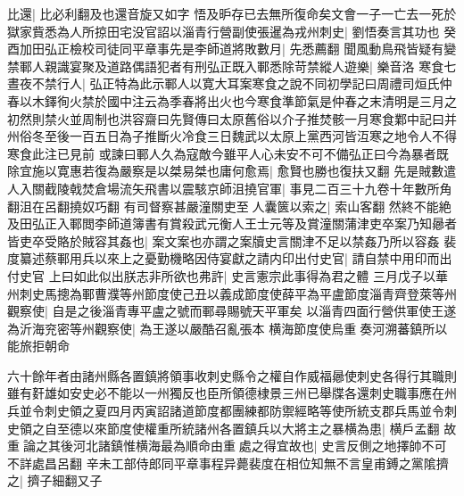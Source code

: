 比還|{
	比必利翻及也還音旋又如字}
悟及昈存已去無所復命矣文會一子一亡去一死於獄家貲悉為人所掠田宅没官詔以淄青行營副使張暹為戎州刺史|{
	劉悟奏言其功也}
癸酉加田弘正檢校司徒同平章事先是李師道將敗數月|{
	先悉薦翻}
聞風動鳥飛皆疑有變禁鄆人親識宴聚及道路偶語犯者有刑弘正既入鄆悉除苛禁縱人遊樂|{
	樂音洛}
寒食七晝夜不禁行人|{
	弘正特為此示鄆人以寛大耳案寒食之說不同初學記曰周禮司烜氏仲春以木鐸徇火禁於國中注云為季春將出火也今寒食準節氣是仲春之末清明是三月之初然則禁火並周制也洪容齋曰先賢傳曰太原舊俗以介子推焚骸一月寒食鄴中記曰并州俗冬至後一百五日為子推斷火冷食三日魏武以太原上黨西河皆沍寒之地令人不得寒食此注已見前}
或諫曰鄆人久為寇敵今雖平人心未安不可不備弘正曰今為暴者既除宜施以寛惠若復為嚴察是以桀易桀也庸何愈焉|{
	愈賢也勝也復扶又翻}
先是賊數遣人入關截陵戟焚倉場流矢飛書以震駭京師沮撓官軍|{
	事見二百三十九卷十年數所角翻沮在呂翻撓奴巧翻}
有司督察甚嚴潼關吏至人囊篋以索之|{
	索山客翻}
然終不能絶及田弘正入鄆閲李師道簿書有賞殺武元衡人王士元等及賞潼關蒲津吏卒案乃知曏者皆吏卒受賂於賊容其姦也|{
	案文案也亦謂之案牘史言關津不足以禁姦乃所以容姦}
裴度纂述蔡鄆用兵以來上之憂勤機略因侍宴獻之請内印出付史官|{
	請自禁中用印而出付史官}
上曰如此似出朕志非所欲也弗許|{
	史言憲宗此事得為君之體}
三月戊子以華州刺史馬摠為鄆曹濮等州節度使己丑以義成節度使薛平為平盧節度淄青齊登萊等州觀察使|{
	自是之後淄青專平盧之號而鄆尋賜號天平軍矣}
以淄青四面行營供軍使王遂為沂海兖密等州觀察使|{
	為王遂以嚴酷召亂張本}
横海節度使烏重奏河溯蕃鎮所以能旅拒朝命

六十餘年者由諸州縣各置鎮將領事收刺史縣令之權自作威福曏使刺史各得行其職則雖有姧雄如安史必不能以一州獨反也臣所領德棣景三州已舉牒各還刺史職事應在州兵並令刺史領之夏四月丙寅詔諸道節度都團練都防禦經略等使所統支郡兵馬並令刺史領之自至德以來節度使權重所統諸州各置鎮兵以大將主之暴横為患|{
	横戶孟翻}
故重論之其後河北諸鎮惟横海最為順命由重處之得宜故也|{
	史言反側之地擇帥不可不詳處昌呂翻}
辛未工部侍郎同平章事程异薨裴度在相位知無不言皇甫鎛之黨隂擠之|{
	擠子細翻又子}


